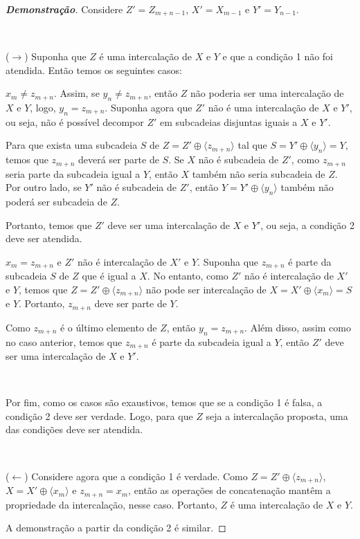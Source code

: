 \begin{proof}[\textbf{Demonstração}]
    Considere $Z' = Z_{m + n - 1}$, $X' = X_{m - 1}$ e $Y' = Y_{n - 1}$.

    ~

    ($\rightarrow$) Suponha que $Z$ é uma intercalação de $X$ e $Y$ e que a condição 1 não foi atendida. Então temos os seguintes casos:

    \begin{casos}
        \item $x_m \ne z_{m + n}$. Assim, se $y_n \ne z_{m + n}$, então $Z$ não poderia ser uma intercalação de $X$ e $Y$, logo, $y_n = z_{m + n}$. Suponha agora que $Z'$ não é uma intercalação de $X$ e $Y'$, ou seja, não é possível decompor $Z'$ em subcadeias disjuntas iguais a $X$ e $Y'$.

        Para que exista uma subcadeia $S$ de $Z = Z' \oplus \langle z_{m + n} \rangle$ tal que $S = Y' \oplus \langle y_n \rangle = Y$, temos que $z_{m + n}$ deverá ser parte de $S$. Se $X$ não é subcadeia de $Z'$, como $z_{m + n}$ seria parte da subcadeia igual a $Y$, então $X$ também não seria subcadeia de $Z$. Por outro lado, se $Y'$ não é subcadeia de $Z'$, então $Y = Y' \oplus \langle y_n \rangle$ também não poderá ser subcadeia de $Z$.

        Portanto, temos que $Z'$ deve ser uma intercalação de $X$ e $Y'$, ou seja, a condição 2 deve ser atendida.

        \item $x_m = z_{m + n}$ e $Z'$ não é intercalação de $X'$ e $Y$. Suponha que $z_{m + n}$ é parte da subcadeia $S$ de $Z$ que é igual a $X$. No entanto, como $Z'$ não é intercalação de $X'$ e $Y$, temos que $Z = Z' \oplus \langle z_{m + n} \rangle$ não pode ser intercalação de $X = X' \oplus \langle x_m \rangle = S$ e $Y$. Portanto, $z_{m + n}$ deve ser parte de $Y$.

        Como $z_{m + n}$ é o último elemento de $Z$, então $y_n = z_{m + n}$. Além disso, assim como no caso anterior, temos que $z_{m + n}$ é parte da subcadeia igual a $Y$, então $Z'$ deve ser uma intercalação de $X$ e $Y'$.
    \end{casos}

    ~

    Por fim, como os casos são exaustivos, temos que se a condição 1 é falsa, a condição 2 deve ser verdade. Logo, para que $Z$ seja a intercalação proposta, uma das condições deve ser atendida.

    ~

    ($\leftarrow$) Considere agora que a condição 1 é verdade. Como $Z = Z' \oplus \langle z_{m + n} \rangle$, $X = X' \oplus \langle x_m \rangle$ e $z_{m + n} = x_m$, então as operações de concatenação mantêm a propriedade da intercalação, nesse caso. Portanto, $Z$ é uma intercalação de $X$ e $Y$.

    A demonstração a partir da condição 2 é similar.
\end{proof}

